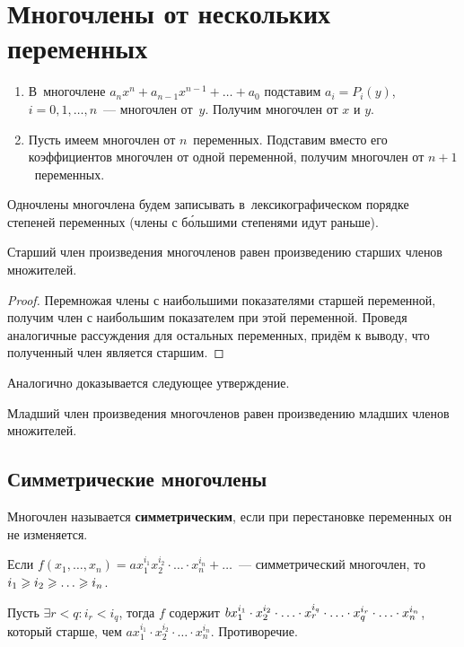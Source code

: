 \section{Многочлены от нескольких переменных}
\begin{enumerate}
	\item В~многочлене $a_n x^n + a_{n-1} x^{n-1} + \ldots + a_0$ подставим $a_i = P_i(y)$, $i = 0, 1, \ldots, n$~--- многочлен от~$y$.
	Получим многочлен от $x$ и $y$.
	
	\item Пусть имеем многочлен от $n$~переменных.
	Подставим вместо его коэффициентов многочлен от одной переменной, получим многочлен от $n + 1$~переменных.
\end{enumerate}

Одночлены многочлена будем записывать в~лексикографическом порядке степеней переменных (члены с б\'{о}ль\-ши\-ми степенями идут раньше).

\begin{statement}
Старший член произведения многочленов равен произведению старших членов множителей.
\end{statement}
\begin{proof}
Перемножая члены с наибольшими показателями старшей переменной, получим член с наибольшим показателем при этой переменной.
Проведя аналогичные рассуждения для остальных переменных, придём к выводу, что полученный член является старшим.
\end{proof}

Аналогично доказывается следующее утверждение.
\begin{statement}
Младший член произведения многочленов равен произведению младших членов множителей.
\end{statement}

\subsection{Симметрические многочлены}
 Многочлен называется \textbf{симметрическим}, если при перестановке переменных он не изменяется.

\begin{statement}
Если $f(x_1, \ldots, x_n) = a x_1^{i_1} x_2^{i_2} \cdot \ldots \cdot x_n^{i_n} + \ldots$~--- симметрический многочлен, то $i_1 \opbr\geqslant i_2 \opbr\geqslant \ldots \opbr\geqslant i_n$.
\end{statement}
\begin{proofcontra}
Пусть $\exists r < q \colon i_r < i_q$, тогда $f$ содержит
$b x_1^{i_1} \opbr\cdot x_2^{i_2} \opbr\cdot \ldots \opbr\cdot x_r^{i_q} \opbr\cdot \ldots \opbr\cdot x_q^{i_r} \opbr\cdot \ldots \opbr\cdot x_n^{i_n}$, который старше, чем
$a x_1^{i_1} \cdot x_2^{i_2} \cdot \ldots \cdot x_n^{i_n}$.
Противоречие.
\end{proofcontra}


